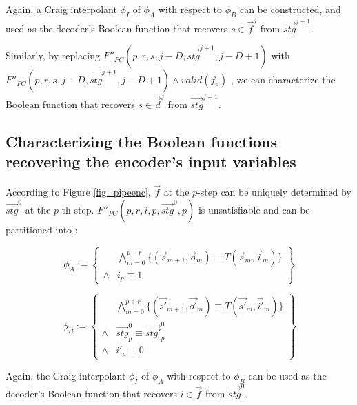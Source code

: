 \documentclass[conference]{IEEEtran}
\begin{document}
Again,
a Craig interpolant $\phi_I$ of $\phi_A$ with respect to $\phi_B$ can be constructed,
and used as the decoder's Boolean function that recovers $s\in\vec{f}^{j}$ from $\vec{stg}^{j+1}$.

Similarly,
by replacing $F''_{PC}(p,r,s,j-D,\vec{stg}^{j+1},j-D+1)$  with 
$F''_{PC}(p,r,s,j-D,\vec{stg}^{j+1},j-D+1)\wedge valid(f_p)$ ,
we can characterize the Boolean function that recovers $s\in\vec{d}^{j}$ from $\vec{stg}^{j+1}$.

\subsection{Characterizing the Boolean functions recovering the encoder's input variables}

According to Figure \ref{fig_pipeenc},
$\vec{f}$ at the $p$-step can be uniquely determined by $\vec{stg}^0$ at the $p$-th step.
$F''_{PC}(p,r,i,p,\vec{stg}^0,p)$ is unsatisfiable and can be partitioned into :

\begin{equation}
\phi_A:=
\left\{
\begin{array}{cc}
&\bigwedge_{m=0}^{p+r}
\{
(\vec{s}_{m+1},\vec{o}_m)\equiv T(\vec{s}_m,\vec{i}_m)
\}
\\
\wedge& i_{p}\equiv 1 
\end{array}
\right\}
\end{equation}

\begin{equation}
\phi_B:=
\left\{
\begin{array}{cc}
&\bigwedge_{m=0}^{p+r}
\{
(\vec{s'}_{m+1},\vec{o'}_m)\equiv T(\vec{s'}_m,\vec{i'}_m)
\}
\\
\wedge&\vec{stg}^0_p\equiv \vec{stg'}^0_p \\
\wedge& i'_{p}\equiv 0 
\end{array}
\right\}
\end{equation}

Again,
the Craig interpolant $\phi_I$ of $\phi_A$ with respect to $\phi_B$ 
can be used as the decoder's Boolean function that recovers $i\in\vec{f}$ from $\vec{stg}^0$.
\end{document}
